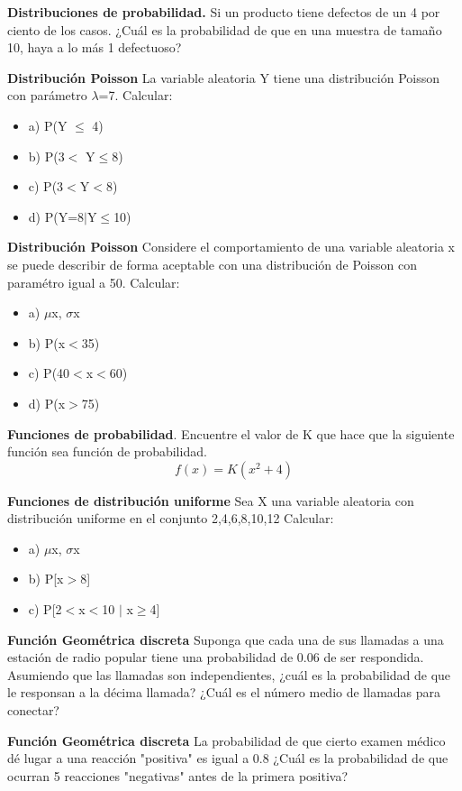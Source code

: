 \documentclass{oxmathproblems}
\begin{document}
\begin{questions}


\miquestion \textbf {Distribuciones de probabilidad.} Si un producto tiene defectos de un 4 por ciento de los casos. ¿Cuál es la probabilidad de que en una muestra de tamaño 10, haya a lo más 1 defectuoso?

\miquestion \textbf {Distribución Poisson} La variable aleatoria Y tiene una distribución Poisson con parámetro $\lambda$=7. 
Calcular: 
\begin{itemize}
\item  a) P(Y $\leq$ 4)
\item  b) P(3$<$ Y$\leq$8)
\item  c) P(3$<$Y$<$8)
\item  d) P(Y=8$\mid$Y$\leq$10)
\end{itemize}

\miquestion \textbf {Distribución Poisson} Considere el comportamiento de una variable aleatoria x se puede describir de forma aceptable con una distribución de Poisson con paramétro igual a 50. 
Calcular: 
\begin{itemize}
\item a) $\mu${x}, $\sigma${x}
\item  b) P(x$<$35)
\item  c) P(40$<$x$<$60)
\item  d) P(x$>$75)
\end{itemize}

\miquestion \textbf{Funciones de probabilidad}.  Encuentre el valor de K que hace que la siguiente función sea función de probabilidad. 
 $$f(x) = K(x^2 + 4)$$

	
\miquestion \textbf{Funciones de distribución uniforme} Sea X una variable aleatoria con distribución uniforme en el conjunto {2,4,6,8,10,12}
Calcular: 
\begin{itemize}
\item  a) $\mu${x}, $\sigma${x}
\item  b) P[x$>$8]
\item  c) P[2$<$x$<$10 $\mid$ x$\geq$4]
\end{itemize}
	
\miquestion \textbf {Función Geométrica discreta} Suponga que cada una de sus llamadas a una estación de radio popular tiene una probabilidad de 0.06 de ser respondida. Asumiendo que las  llamadas son independientes, ¿cuál es la probabilidad de que le responsan a la décima llamada? ¿Cuál es el número medio de llamadas para conectar?

\miquestion \textbf {Función Geométrica discreta} La probabilidad de que cierto examen médico dé lugar a una reacción "positiva" es igual a 0.8 ¿Cuál es la probabilidad de que ocurran 5 reacciones "negativas" antes de la primera positiva?



\end{questions}
\end{document}
